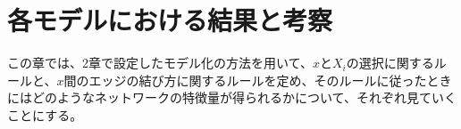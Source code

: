 \chapter{各モデルにおける結果と考察}

この章では、2章で設定したモデル化の方法を用いて、$x$と$X_{i}$の選択に関するルールと、$x$間のエッジの結び方に関するルールを定め、そのルールに従ったときにはどのようなネットワークの特徴量が得られるかについて、それぞれ見ていくことにする。







